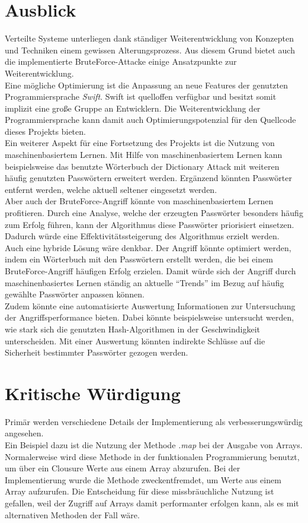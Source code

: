 \section{Ausblick}
\label{ausblick}
Verteilte Systeme unterliegen dank ständiger Weiterentwicklung von Konzepten und Techniken einem gewissen Alterungsprozess. Aus diesem Grund bietet auch die implementierte BruteForce-Attacke einige Ansatzpunkte zur Weiterentwicklung. \\
Eine mögliche Optimierung ist die Anpassung an neue Features der genutzten Programmiersprache \emph{Swift}. Swift ist quelloffen verfügbar und besitzt somit implizit eine große Gruppe an Entwicklern. Die Weiterentwicklung der Programmiersprache kann damit auch Optimierungspotenzial für den Quellcode dieses Projekts bieten. \\
Ein weiterer Aspekt für eine Fortsetzung des Projekts ist die Nutzung von maschinenbasiertem Lernen. Mit Hilfe von maschinenbasiertem Lernen kann beispielsweise das benutzte Wörterbuch der Dictionary Attack mit weiteren häufig genutzten Passwörtern erweitert werden. Ergänzend könnten Passwörter entfernt werden, welche aktuell seltener eingesetzt werden.\\

 Aber auch der BruteForce-Angriff könnte von maschinenbasiertem Lernen profitieren. Durch eine Analyse, welche der erzeugten Passwörter besonders häufig zum Erfolg führen, kann der Algorithmus diese Passwörter priorisiert einsetzen. Dadurch würde eine Effektivitätssteigerung des Algorithmus erzielt werden. \\
 
Auch eine hybride Lösung wäre denkbar. Der Angriff könnte optimiert werden, indem ein Wörterbuch mit den Passwörtern erstellt werden, die bei einem BruteForce-Angriff häufigen Erfolg erzielen. Damit würde sich der Angriff durch maschinenbasiertes Lernen ständig an aktuelle \enquote{Trends} im Bezug auf häufig gewählte Passwörter anpassen können. \\
Zudem könnte eine automatisierte Auswertung Informationen zur Untersuchung der Angriffsperformance bieten. Dabei könnte beispielsweise untersucht werden, wie stark sich die genutzten Hash-Algorithmen in der Geschwindigkeit unterscheiden. Mit einer Auswertung könnten indirekte Schlüsse auf die Sicherheit bestimmter Passwörter gezogen werden. 

\section{Kritische Würdigung}
\label{kritik}
Primär werden verschiedene Details der Implementierung als verbesserungswürdig angesehen. \\
Ein Beispiel dazu ist die Nutzung der Methode \emph{.map} bei der Ausgabe von Arrays. Normalerweise wird diese Methode in der funktionalen Programmierung benutzt, um über ein Clousure Werte aus einem Array abzurufen. Bei der Implementierung wurde die Methode zweckentfremdet, um Werte aus einem Array aufzurufen. Die Entscheidung für diese missbräuchliche Nutzung ist gefallen, weil der Zugriff auf Arrays damit performanter erfolgen kann, als es mit alternativen Methoden der Fall wäre. \\


